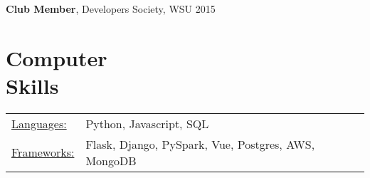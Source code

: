 \documentclass[margin]{res}
\begin{document}
\begin{resume}
		{\bf Club Member}, Developers Society, WSU \hfill   2015

\section{Computer \\ Skills}
   \begin{tabular}{l p{3in}}
    \underline{Languages:} & Python, Javascript, SQL \\
	\underline{Frameworks:} &  Flask, Django, PySpark, Vue, Postgres, AWS, MongoDB \\
 \end{tabular}

\end{resume}
\end{document}
